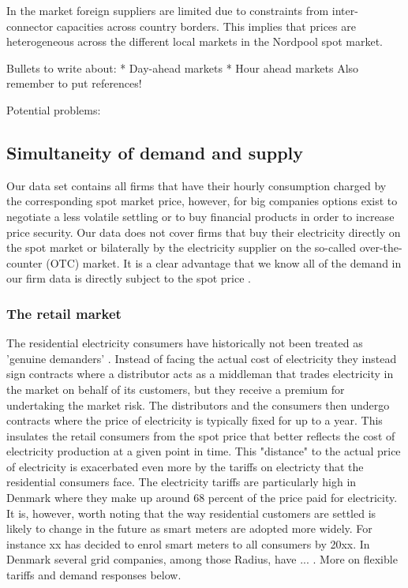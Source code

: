 In the market foreign suppliers are limited due to constraints from inter-connector capacities across country borders. This implies that prices are heterogeneous across the different local markets in the Nordpool spot market. 

Bullets to write about: 
* Day-ahead markets
* Hour ahead markets 
Also remember to put references! 

Potential problems: 


\subsection{Simultaneity of demand and supply}
\label{subsec:t_simultaneity}
Our data set contains all firms that have their hourly consumption charged by the corresponding spot market price, however, for big companies options exist to negotiate a less volatile settling or to buy financial products in order to increase price security. Our data does not cover firms that buy their electricity directly on the spot market or bilaterally by the electricity supplier on the so-called over-the-counter (OTC) market. It is a clear advantage that we know all of the demand in our firm data is directly subject to the spot price \citep{lijesen2007real}.


\subsubsection{The retail market} %
\label{subsubsec: t_resmarket}
The residential electricity consumers have historically not been treated as 'genuine demanders' \citep{kirschen2003demand}. Instead of facing the actual cost of electricity they instead sign contracts where a distributor acts as a middleman that trades electricity in the market on behalf of its customers, but they receive a premium for undertaking the market risk. The distributors and the consumers then undergo contracts where the price of electricity is typically fixed for up to a year. This insulates the retail consumers from the spot price that better reflects the cost of electricity production at a given point in time. This "distance" to the actual price of electricity is exacerbated even more by the tariffs on electricty that the residential consumers face. The electricity tariffs are particularly high in Denmark where they make up around 68 percent of the price paid for electricity. \smallskip \\ 

It is, however, worth noting that the way residential customers are settled is likely to change in the future as smart meters are adopted more widely. For instance xx has decided to enrol smart meters to all consumers by 20xx. In Denmark several grid companies, among those Radius, have ... . More on flexible tariffs and demand responses below.  



